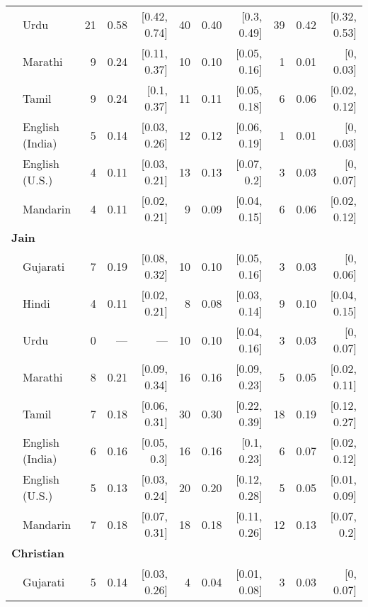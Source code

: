 \begin{table}[t]
\begin{footnotesize}
\begin{tabular}{p{.1in}lrrrrrrrrr}
 & Urdu & 21 & 0.58 & [0.42, 0.74] & 40 & 0.40 & [0.3, 0.49] & 39 & 0.42 & [0.32, 0.53]\\

 & Marathi & 9 & 0.24 & [0.11, 0.37] & 10 & 0.10 & [0.05, 0.16] & 1 & 0.01 & [0, 0.03]\\

 & Tamil & 9 & 0.24 & [0.1, 0.37] & 11 & 0.11 & [0.05, 0.18] & 6 & 0.06 & [0.02, 0.12]\\

 & English (India) & 5 & 0.14 & [0.03, 0.26] & 12 & 0.12 & [0.06, 0.19] & 1 & 0.01 & [0, 0.03]\\

 & English (U.S.) & 4 & 0.11 & [0.03, 0.21] & 13 & 0.13 & [0.07, 0.2] & 3 & 0.03 & [0, 0.07]\\
 & Mandarin & 4 & 0.11 & [0.02, 0.21] & 9 & 0.09 & [0.04, 0.15] & 6 & 0.06 & [0.02, 0.12]\\
 \midrule
\multicolumn{11}{l}{\textbf{Jain}}\\
  & Gujarati & 7 & 0.19 & [0.08, 0.32] & 10 & 0.10 & [0.05, 0.16] & 3 & 0.03 & [0, 0.06]\\

 & Hindi & 4 & 0.11 & [0.02, 0.21] & 8 & 0.08 & [0.03, 0.14] & 9 & 0.10 & [0.04, 0.15]\\

 & Urdu & 0 & --- & --- & 10 & 0.10 & [0.04, 0.16] & 3 & 0.03 & [0, 0.07]\\

 & Marathi & 8 & 0.21 & [0.09, 0.34] & 16 & 0.16 & [0.09, 0.23] & 5 & 0.05 & [0.02, 0.11]\\

 & Tamil & 7 & 0.18 & [0.06, 0.31] & 30 & 0.30 & [0.22, 0.39] & 18 & 0.19 & [0.12, 0.27]\\

 & English (India) & 6 & 0.16 & [0.05, 0.3] & 16 & 0.16 & [0.1, 0.23] & 6 & 0.07 & [0.02, 0.12]\\

 & English (U.S.) & 5 & 0.13 & [0.03, 0.24] & 20 & 0.20 & [0.12, 0.28] & 5 & 0.05 & [0.01, 0.09]\\

& Mandarin & 7 & 0.18 & [0.07, 0.31] & 18 & 0.18 & [0.11, 0.26] & 12 & 0.13 & [0.07, 0.2]\\
 \midrule
\multicolumn{11}{l}{\textbf{Christian}}\\
 & Gujarati & 5 & 0.14 & [0.03, 0.26] & 4 & 0.04 & [0.01, 0.08] & 3 & 0.03 & [0, 0.07]\\


\end{tabular}
\end{footnotesize}
\end{table}
